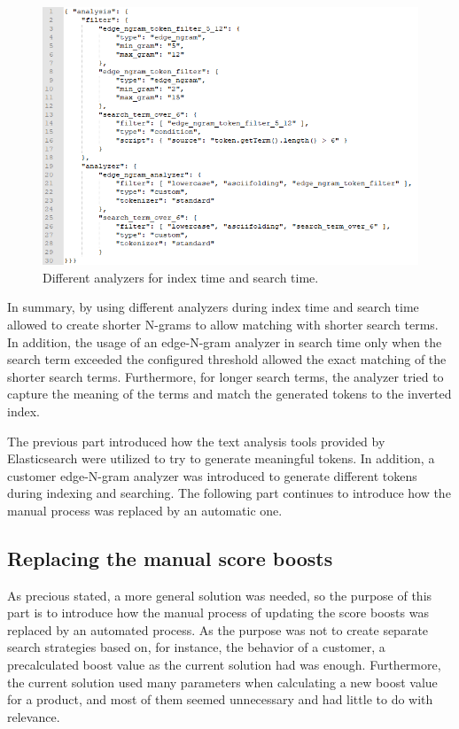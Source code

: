 \begin{figure}
    \centering
    \includegraphics[width=\textwidth]{img/new-analyzer.png}
    \caption{Different analyzers for index time and search time.}
    \label{fig:new-analyzer}
\end{figure}

In summary, by using different analyzers during index time and search time allowed to create shorter N-grams to allow
matching with shorter search terms. 
In addition, the usage of an edge-N-gram analyzer in search time only when the search term exceeded the configured
threshold allowed the exact matching of the shorter search terms.
Furthermore, for longer search terms, the analyzer tried to capture the meaning of the terms and 
match the generated tokens to the inverted index.


The previous part introduced how the text analysis tools provided by Elasticsearch 
were utilized to try to generate meaningful tokens.
In addition, a customer edge-N-gram analyzer was introduced to generate different tokens during indexing and searching.
The following part continues to introduce how the manual process was replaced by an automatic one.


\subsection{Replacing the manual score boosts}


As precious stated, a more general solution was needed, so the purpose of this part is to
introduce how the manual process of updating the score boosts was replaced by an automated process.
As the purpose was not to create separate search strategies based on, for instance, the behavior of a customer, 
a precalculated boost value as the current solution had was enough.
Furthermore, the current solution used many parameters when calculating a new boost value for a product, and 
most of them seemed unnecessary and had little to do with relevance.

